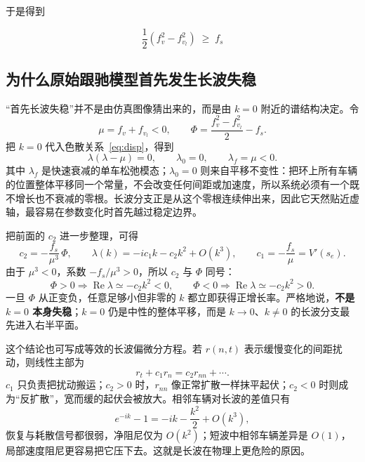 \documentclass[11pt,a4paper,openany]{book}
\numberwithin{equation}{chapter}
\numberwithin{figure}{chapter}
\numberwithin{table}{chapter}
\begin{document}
于是得到
\begin{tcolorbox}[keybox,title=\textbf{线稳定性条件（长波）}]
\begin{equation}
\frac{1}{2}\left(f_v^2 - f_{v_l}^2\right) \;\ge\; f_s
\label{eq:string}
\end{equation}
\end{tcolorbox}

\subsection{为什么原始跟驰模型首先发生长波失稳}
\label{sub:why-long-wave-first}

“首先长波失稳”并不是由仿真图像猜出来的，而是由 $k=0$ 附近的谱结构决定。令
\begin{equation}
\mu=f_v+f_{v_l}<0,
\qquad
\Phi=\frac{f_v^2-f_{v_l}^2}{2}-f_s .
\end{equation}
把 $k=0$ 代入色散关系~\eqref{eq:disp}，得到
\begin{equation}
\lambda(\lambda-\mu)=0,
\qquad
\lambda_0=0,\qquad \lambda_f=\mu<0 .
\label{eq:k0roots}
\end{equation}
其中 $\lambda_f$ 是快速衰减的单车松弛模态；$\lambda_0=0$ 则来自平移不变性：把环上所有车辆的位置整体平移同一个常量，不会改变任何间距或加速度，所以系统必须有一个既不增长也不衰减的零根。长波分支正是从这个零根连续伸出来，因此它天然贴近虚轴，最容易在参数变化时首先越过稳定边界。

把前面的 $c_2$ 进一步整理，可得
\begin{equation}
c_2=-\frac{f_s}{\mu^3}\,\Phi,
\qquad
\lambda(k)=-ic_1k-c_2k^2+O(k^3),
\qquad
c_1=-\frac{f_s}{\mu}=V'(s_e).
\label{eq:longwave-branch}
\end{equation}
由于 $\mu^3<0$，系数 $-f_s/\mu^3>0$，所以 $c_2$ 与 $\Phi$ 同号：
\begin{equation}
\Phi>0\Rightarrow\operatorname{Re}\lambda\simeq-c_2k^2<0,
\qquad
\Phi<0\Rightarrow\operatorname{Re}\lambda\simeq-c_2k^2>0.
\end{equation}
一旦 $\Phi$ 从正变负，任意足够小但非零的 $k$ 都立即获得正增长率。严格地说，\textbf{不是 $k=0$ 本身失稳}；$k=0$ 仍是中性的整体平移，而是 $k\to0$、$k\ne0$ 的长波分支最先进入右半平面。

这个结论也可写成等效的长波偏微分方程。若 $r(n,t)$ 表示缓慢变化的间距扰动，则线性主部为
\begin{equation}
r_t+c_1r_n=c_2r_{nn}+\cdots .
\label{eq:effective-diffusion}
\end{equation}
$c_1$ 只负责把扰动搬运；$c_2>0$ 时，$r_{nn}$ 像正常扩散一样抹平起伏；$c_2<0$ 时则成为“反扩散”，宽而缓的起伏会被放大。相邻车辆对长波的差值只有
\begin{equation}
e^{-ik}-1=-ik-\frac{k^2}{2}+O(k^3),
\end{equation}
恢复与耗散信号都很弱，净阻尼仅为 $O(k^2)$；短波中相邻车辆差异是 $O(1)$，局部速度阻尼更容易把它压下去。这就是长波在物理上更危险的原因。
\end{document}
